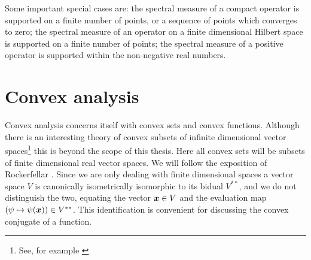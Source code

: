 Some important special cases are: the spectral measure of a compact operator is supported on a finite number of points, or a sequence of points which converges to zero; the spectral measure of an operator on a finite dimensional Hilbert space is supported on a finite number of points; the spectral measure of a positive operator is supported within the non-negative real numbers.

\section{Convex analysis}
\label{sec:prelim-comvex-analysis}
Convex analysis concerns itself with convex sets and convex functions. Although there is an interesting theory of convex subsets of infinite dimensional vector spaces\footnote{See, for example \cite{10.1007/978-1-84800-155-8_12}} this is beyond the scope of this thesis. Here all convex sets will be subsets of finite dimensional real vector spaces. We will follow the exposition of Rockerfellar \cite{rtr-conv-anal-book}. Since we are only dealing with finite dimensional spaces a vector space $V$ is canonically isometrically isomorphic to its bidual $V^{**}$, and we do not distinguish the two, equating the vector $\bm{x}\in V$ and the evaluation map $(\psi\mapsto\psi(\bm{x}))\in V^{**}$. This identification is convenient for discussing the convex conjugate of a function.


